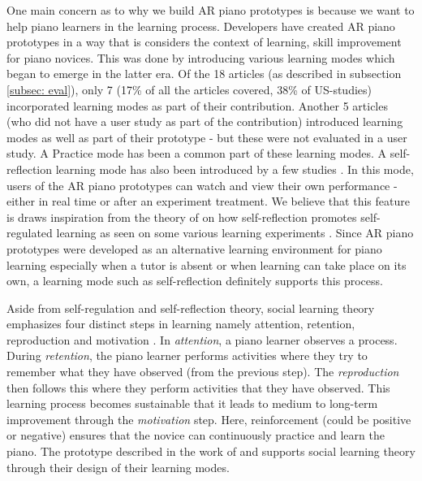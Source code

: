 \documentclass[sigchi, review]{acmart}
\begin{document}
One main concern as to why we build AR piano prototypes is because we want to help piano learners in the learning process. Developers have created AR piano prototypes in a way that is considers the context of learning, skill improvement for piano novices. This was done by introducing various learning modes which began to emerge in the latter era. Of the 18 articles (as described in subsection \ref{subsec: eval}), only 7 (17\% of all the articles covered, 38\% of US-studies) incorporated learning modes as part of their contribution. Another 5 articles (who did not have a user study as part of the contribution) introduced learning modes as well as part of their prototype - but these were not evaluated in a user study. A Practice mode has been a common part of these learning modes. A self-reflection learning mode has also been introduced by a few studies \cite{gerry2019adept, xu20195, xiao2013mirrorfugue}. In this mode, users of the AR piano prototypes can watch and view their own performance - either in real time or after an experiment treatment. We believe that this feature is draws inspiration from the theory of \citet{zimmerman2009self} on how self-reflection promotes self-regulated learning as seen on some various learning experiments \cite{deja2016discovering,lyons2011monitoring}. Since AR piano prototypes were developed as an alternative learning environment for piano learning especially when a tutor is absent or when learning can take place on its own, a learning mode such as self-reflection definitely supports this process. 

Aside from self-regulation and self-reflection theory, social learning theory emphasizes four distinct steps in learning namely attention, retention, reproduction and motivation \cite{bandura1977social}. In \textit{attention}, a piano learner observes a process. During \textit{retention}, the piano learner performs activities where they try to remember what they have observed (from the previous step). The \textit{reproduction} then follows this where they perform activities that they have observed. This learning process becomes sustainable that it leads to medium to long-term improvement through the \textit{motivation} step. Here, reinforcement (could be positive or negative) ensures that the novice can continuously practice and learn the piano. The prototype described in the work of \citet{weing2013piano} and \citet{rogers2014piano} supports social learning theory through their design of their learning modes. 
\end{document}
